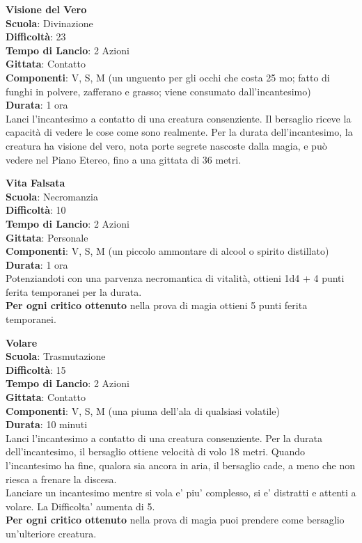 \begin{multicols}{2}
\medskip\textbf{Visione del Vero}\\
\textbf{Scuola}: Divinazione\\
\textbf{Difficoltà}:  23\\
\textbf{Tempo di Lancio}: 2 Azioni\\
\textbf{Gittata}: Contatto\\
\textbf{Componenti}: V, S, M (un unguento per gli occhi che costa 25 mo; fatto di funghi in polvere, zafferano e grasso; viene consumato dall'incantesimo)\\
\textbf{Durata}: 1 ora\\
Lanci l'incantesimo a contatto di una creatura consenziente. Il bersaglio riceve la capacità di vedere le cose come sono realmente. Per la durata dell'incantesimo, la creatura ha visione del vero, nota porte segrete nascoste dalla magia, e può vedere nel Piano Etereo, fino a una gittata di 36 metri.

\medskip\textbf{Vita Falsata}\\
\textbf{Scuola}: Necromanzia\\
\textbf{Difficoltà}:  10\\
\textbf{Tempo di Lancio}: 2 Azioni\\
\textbf{Gittata}: Personale\\
\textbf{Componenti}: V, S, M (un piccolo ammontare di alcool o spirito distillato)\\
\textbf{Durata}: 1 ora\\
Potenziandoti con una parvenza necromantica di vitalità, ottieni 1d4 + 4 punti ferita temporanei per la durata.\\
\textbf{Per ogni critico ottenuto} nella prova di magia ottieni 5 punti ferita temporanei.

\medskip\textbf{Volare}\\
\textbf{Scuola}: Trasmutazione\\
\textbf{Difficoltà}:  15\\
\textbf{Tempo di Lancio}: 2 Azioni\\
\textbf{Gittata}: Contatto\\
\textbf{Componenti}: V, S, M (una piuma dell'ala di qualsiasi volatile)\\
\textbf{Durata}: 10 minuti \\
Lanci l'incantesimo a contatto di una creatura consenziente. Per la durata dell'incantesimo, il bersaglio ottiene velocità di volo 18 metri. Quando l'incantesimo ha fine, qualora sia ancora in aria, il bersaglio cade, a meno che non riesca a frenare la discesa.\\
Lanciare un incantesimo mentre si vola e' piu' complesso, si e' distratti e attenti a volare. La Difficolta' aumenta di 5.\\
\textbf{Per ogni critico ottenuto} nella prova di magia puoi prendere come bersaglio un'ulteriore creatura.


\end{multicols}

